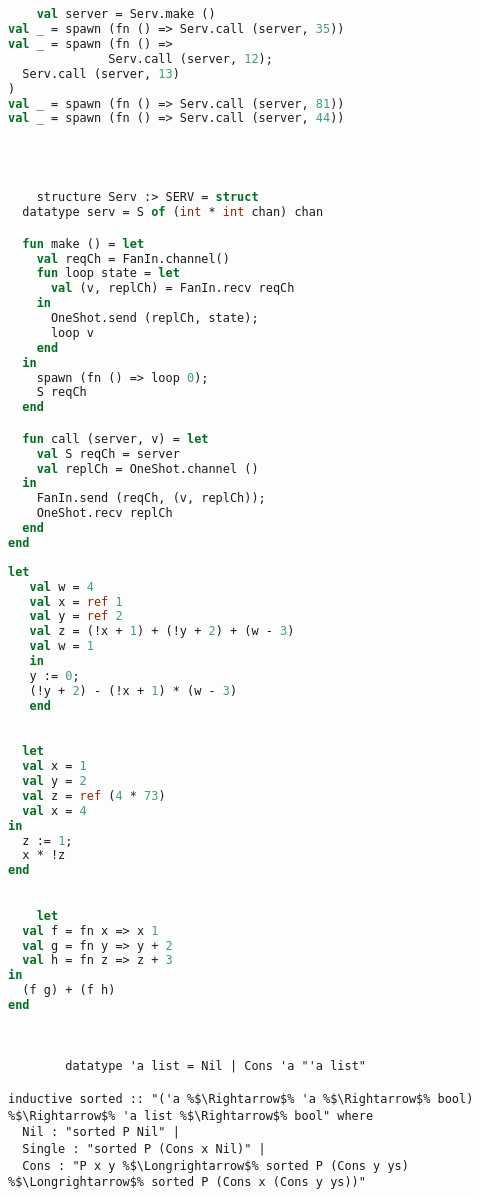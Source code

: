 \documentclass{article}
\begin{document}
  \begin{lstlisting}[language=ML, style=mystyle]


    val server = Serv.make ()
val _ = spawn (fn () => Serv.call (server, 35))
val _ = spawn (fn () => 
			  Serv.call (server, 12); 
  Serv.call (server, 13)
)
val _ = spawn (fn () => Serv.call (server, 81))
val _ = spawn (fn () => Serv.call (server, 44))
  \end{lstlisting}
  
  \begin{lstlisting}[language=ML, style=mystyle]



    structure Serv :> SERV = struct 
  datatype serv = S of (int * int chan) chan 

  fun make () = let 
    val reqCh = FanIn.channel()
    fun loop state = let
      val (v, replCh) = FanIn.recv reqCh
    in 
      OneShot.send (replCh, state);
      loop v 
    end    
  in
    spawn (fn () => loop 0);
    S reqCh
  end 

  fun call (server, v) = let 
    val S reqCh = server
    val replCh = OneShot.channel ()
  in 
    FanIn.send (reqCh, (v, replCh));
    OneShot.recv replCh 
  end
end
  \end{lstlisting}

  \begin{lstlisting}[language=ML, style=mystyle]
   let
   val w = 4
   val x = ref 1
   val y = ref 2
   val z = (!x + 1) + (!y + 2) + (w - 3)
   val w = 1
   in
   y := 0;
   (!y + 2) - (!x + 1) * (w - 3)
   end
  \end{lstlisting}

  \begin{lstlisting}[language=ML, style=mystyle]

  let 
  val x = 1    
  val y = 2
  val z = ref (4 * 73)
  val x = 4
in 
  z := 1; 
  x * !z
end
  \end{lstlisting}

  \begin{lstlisting}[language=ML, style=mystyle]

    let 
  val f = fn x => x 1
  val g = fn y => y + 2
  val h = fn z => z + 3
in 
  (f g) + (f h)
end

    \end{lstlisting}

      \begin{lstlisting}[language=ML, style=mystyle]
    \end{lstlisting}

      \begin{lstlisting}[style=mystyle, escapechar=\%]

        datatype 'a list = Nil | Cons 'a "'a list"

inductive sorted :: "('a %$\Rightarrow$% 'a %$\Rightarrow$% bool) %$\Rightarrow$% 'a list %$\Rightarrow$% bool" where
  Nil : "sorted P Nil" |
  Single : "sorted P (Cons x Nil)" |
  Cons : "P x y %$\Longrightarrow$% sorted P (Cons y ys) %$\Longrightarrow$% sorted P (Cons x (Cons y ys))"
\end{lstlisting}
\end{document}
